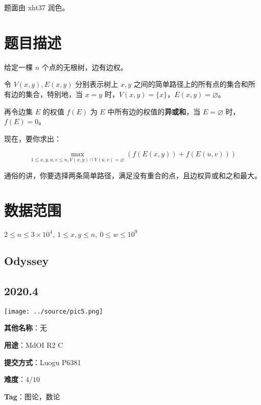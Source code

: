 \documentclass[a4paper,10pt]{article}
\begin{document}
题面由 xht37 润色。

\section*{题目描述}

给定一棵 $n$ 个点的无根树，边有边权。

令 $V(x,y),E(x,y)$ 分别表示树上 $x,y$ 之间的简单路径上的所有点的集合和所有边的集合，特别地，当 $x=y$ 时，$V(x,y) = \{x\}$，$E(x,y)=\varnothing$。

再令边集 $E$ 的权值 $f(E)$ 为 $E$ 中所有边的权值的\textbf{异或和}，当 $E=\varnothing$ 时，$f(E) = 0$。

现在，要你求出：

$$
\max_{1\le x,y,u,v \le n,V(x,y)\cap V(u,v)=\varnothing}(f(E(x,y)) + f(E(u,v)))
$$

通俗的讲，你要选择两条简单路径，满足没有重合的点，且边权异或和之和最大。

\section*{数据范围}

$2\leq n\leq 3\times 10^4,\ 1\leq x,y\leq n,\ 0\leq w\leq 10^9$

\newpage

\vspace*{\fill}
\begin{center}

\section{Odyssey}

\subsection*{2020.4}

\vspace{10pt}

\texttt{[image: ../source/pic5.png]}

\vspace{10pt}

\textbf{其他名称}：无

\vspace{10pt}

\textbf{用途}：MdOI R2 C

\vspace{10pt}

\textbf{提交方式}：Luogu P6381

\vspace{10pt}

\textbf{难度}：$4/10$

\vspace{10pt}

\textbf{Tag}：图论，数论

\end{center}
\vspace*{\fill}
\end{document}
